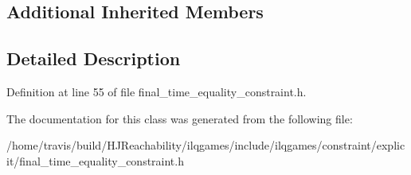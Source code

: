 \subsection*{Additional Inherited Members}


\subsection{Detailed Description}


Definition at line 55 of file final\+\_\+time\+\_\+equality\+\_\+constraint.\+h.



The documentation for this class was generated from the following file\+:\begin{DoxyCompactItemize}
\item 
/home/travis/build/\+H\+J\+Reachability/ilqgames/include/ilqgames/constraint/explicit/final\+\_\+time\+\_\+equality\+\_\+constraint.\+h\end{DoxyCompactItemize}
